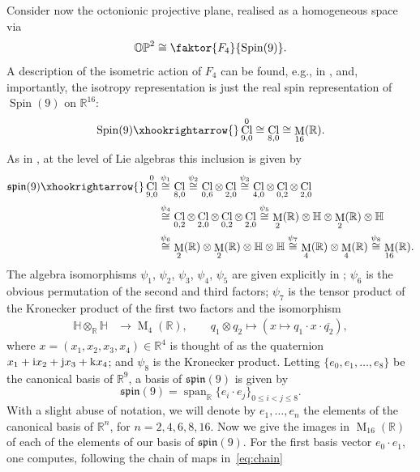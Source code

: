\documentclass[pdftex]{sigma}
\numberwithin{equation}{section}
\newcommand{\R}{\mathbb{R}} %
\DeclareMathOperator{\Span}{span}
\DeclareMathOperator{\Spin}{Spin}
\DeclareMathOperator{\Cl}{Cl}
\DeclareMathOperator{\Mat}{M}
\begin{document}
		Consider now the octonionic projective plane, realised as a homogeneous space via
		\[
		\mathbb{OP}^{2} \cong \faktor{F_4}{\Spin(9)} .
		\]
		A description of the isometric action of $F_4$ can be found, e.g., in \cite{Baez_octonions}, and, importantly, the isotropy representation is just the real spin representation of $\Spin(9)$ on $\mathbb{R}^{16}$: %
		\[
		\Spin(9) \xhookrightarrow{} \Cl^{0}_{9,0} \cong \Cl_{8,0} \cong \Mat_{16}( \mathbb{R} ) .
		\]
		As in \cite[Theorems~1.4.3 and 1.4.4, Proposition~1.4.5]{wernli}, at the level of Lie algebras this inclusion is given by
		\begin{align}
				\mathfrak{spin}(9) \xhookrightarrow{} \Cl^{0}_{9,0} &\overset{\psi_1}{\cong} \Cl_{8,0} \overset{\psi_2}{\cong} \Cl_{0,6} \otimes \Cl_{2,0} \overset{\psi_3}{\cong} \Cl_{4,0} \otimes \Cl_{0,2} \otimes \Cl_{2,0} \nonumber\\
				&\overset{\psi_4}{\cong} \Cl_{0,2} \otimes \Cl_{2,0} \otimes \Cl_{0,2} \otimes \Cl_{2,0} \overset{\psi_5}{\cong} \Mat_2 ( \mathbb{R} ) \otimes \mathbb{H} \otimes \Mat_2 ( \mathbb{R} ) \otimes \mathbb{H}\nonumber \\
				&\overset{\psi_6}{\cong} \Mat_2 ( \mathbb{R} ) \otimes \Mat_2 ( \mathbb{R} ) \otimes \mathbb{H} \otimes \mathbb{H} \overset{\psi_7}{\cong} \Mat_{4} ( \mathbb{R} ) \otimes \Mat_{4} ( \mathbb{R} ) \overset{\psi_8}{\cong} \Mat_{16} ( \mathbb{R} ) . \label{eq:chain}
		\end{align}
		The algebra isomorphisms $\psi_{1}$, $\psi_{2}$, $\psi_{3}$, $\psi_{4}$, $\psi_{5}$ are given explicitly in \cite{wernli}; $\psi_{6}$ is the obvious permutation of the second and third factors; $\psi_{7}$ is the tensor product of the Kronecker product of the first two factors and the isomorphism
		\begin{align*}
				\mathbb{H} \otimes_{\mathbb{R}} \mathbb{H} &\to \Mat_{4}( \mathbb{R} ),\qquad
				q_1 \otimes q_2 \mapsto ( x \mapsto q_1 \cdot x \cdot \overline{q_2} ),
		\end{align*}
		where $x = ( x_1 , x_2, x_3, x_4 ) \in \mathbb{R}^4$ is thought of as the quaternion $x_1 + {\rm i} x_2 + {\rm j} x_3 + {\rm k} x_4$; and $\psi_{8}$ is the Kronecker product. Letting $ \{e_0, e_1 , \dots , e_8 \}$ be the canonical basis of $\mathbb{R}^9$, a basis of $\mathfrak{spin}(9)$ is given by
		\[
		\mathfrak{spin}(9)= \Span_{\R} \{ e_i \cdot e_j \}_{0 \leq i < j \leq 8} .
		\]
		With a slight abuse of notation, we will denote by $e_1, \dots, e_n$ the elements of the canonical basis of $\mathbb{R}^n$, for $n=2,4,6,8, 16$. Now we give the images in $\Mat_{16}( \mathbb{R} )$ of each of the elements of our basis of $\mathfrak{spin}(9)$. For the first basis vector $e_0\cdot e_1$, one computes, following the chain of maps in~\eqref{eq:chain}
\end{document}
